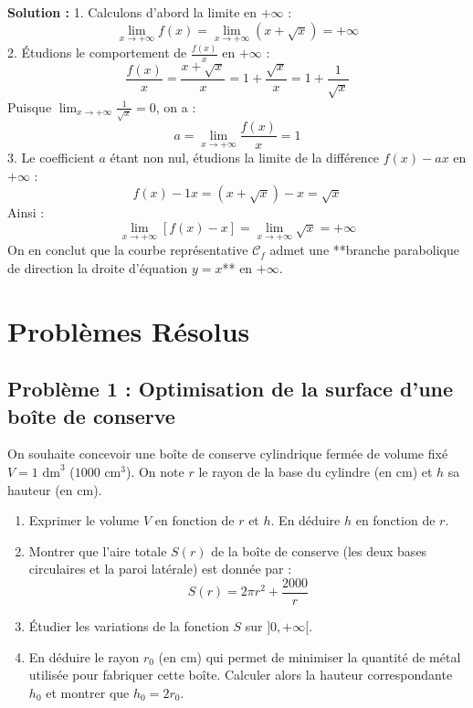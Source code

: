 \textbf{Solution :}
1. Calculons d'abord la limite en $+\infty$ :
   \[
   \lim_{x \to +\infty} f(x) = \lim_{x \to +\infty} (x + \sqrt{x}) = +\infty
   \]
2. Étudions le comportement de $\frac{f(x)}{x}$ en $+\infty$ :
   \[
   \frac{f(x)}{x} = \frac{x + \sqrt{x}}{x} = 1 + \frac{\sqrt{x}}{x} = 1 + \frac{1}{\sqrt{x}}
   \]
   Puisque $\lim_{x \to +\infty} \frac{1}{\sqrt{x}} = 0$, on a :
   \[
   a = \lim_{x \to +\infty} \frac{f(x)}{x} = 1
   \]
3. Le coefficient $a$ étant non nul, étudions la limite de la différence $f(x) - ax$ en $+\infty$ :
   \[
   f(x) - 1x = (x + \sqrt{x}) - x = \sqrt{x}
   \]
   Ainsi :
   \[
   \lim_{x \to +\infty} [f(x) - x] = \lim_{x \to +\infty} \sqrt{x} = +\infty
   \]
On en conclut que la courbe représentative $\mathcal{C}_f$ admet une **branche parabolique de direction la droite d'équation $y = x$** en $+\infty$.

\section{Problèmes Résolus}

\subsection*{Problème 1 : Optimisation de la surface d'une boîte de conserve}
On souhaite concevoir une boîte de conserve cylindrique fermée de volume fixé $V = 1 \text{ dm}^3$ ($1000 \text{ cm}^3$). On note $r$ le rayon de la base du cylindre (en cm) et $h$ sa hauteur (en cm).
\begin{enumerate}
    \item Exprimer le volume $V$ en fonction de $r$ et $h$. En déduire $h$ en fonction de $r$.
    \item Montrer que l'aire totale $S(r)$ de la boîte de conserve (les deux bases circulaires et la paroi latérale) est donnée par :
    \[
    S(r) = 2\pi r^2 + \frac{2000}{r}
    \]
    \item Étudier les variations de la fonction $S$ sur $]0, +\infty[$.
    \item En déduire le rayon $r_0$ (en cm) qui permet de minimiser la quantité de métal utilisée pour fabriquer cette boîte. Calculer alors la hauteur correspondante $h_0$ et montrer que $h_0 = 2r_0$.
\end{enumerate}

